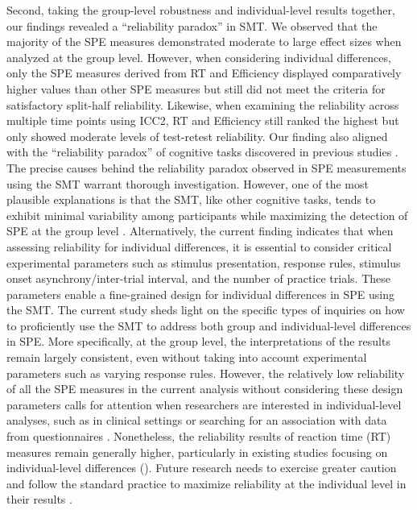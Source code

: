 \documentclass[sn-apa]{sn-jnl}%
\theoremstyle{thmstyleone}%
\theoremstyle{thmstyletwo}%
\theoremstyle{thmstylethree}%
\begin{document}
Second, taking the group-level robustness and individual-level results together, our findings revealed a ``reliability paradox” in SMT. We observed that the majority of the SPE measures demonstrated moderate to large effect sizes when analyzed at the group level. However, when considering individual differences, only the SPE measures derived from RT and Efficiency displayed comparatively higher values than other SPE measures but still did not meet the criteria for satisfactory split-half reliability. Likewise, when examining the reliability across multiple time points using ICC2, RT and Efficiency still ranked the highest but only showed moderate levels of test-retest reliability. Our finding also aligned with the “reliability paradox” of cognitive tasks discovered in previous studies \parencite{hedge2018reliability,enkavi2019large}. The precise causes behind the reliability paradox observed in SPE measurements using the SMT warrant thorough investigation. However, one of the most plausible explanations is that the SMT, like other cognitive tasks, tends to exhibit minimal variability among participants while maximizing the detection of SPE at the group level \parencite{liljequist2019intraclass}. Alternatively, the current finding indicates that when assessing reliability for individual differences, it is essential to consider critical experimental parameters such as stimulus presentation, response rules, stimulus onset asynchrony/inter-trial interval, and the number of practice trials. These parameters enable a fine-grained design for individual differences in SPE using the SMT. The current study sheds light on the specific types of inquiries on how to proficiently use the SMT to address both group and individual-level differences in SPE. More specifically, at the group level, the interpretations of the results remain largely consistent, even without taking into account experimental parameters such as varying response rules. However, the relatively low reliability of all the SPE measures in the current analysis without considering these design parameters calls for attention when researchers are interested in individual-level analyses, such as in clinical settings or searching for an association with data from questionnaires \parencite[e.g.,][]{hobbs2023self,moseley2022levels}. Nonetheless, the reliability results of reaction time (RT) measures remain generally higher, particularly in existing studies focusing on individual-level differences (\parencite[e.g.,][]{liu2022depression,zhang2023decoding}). Future research needs to exercise greater caution and follow the standard practice to maximize reliability at the individual level in their results \parencite{parsons2019psychological}.
\end{document}

